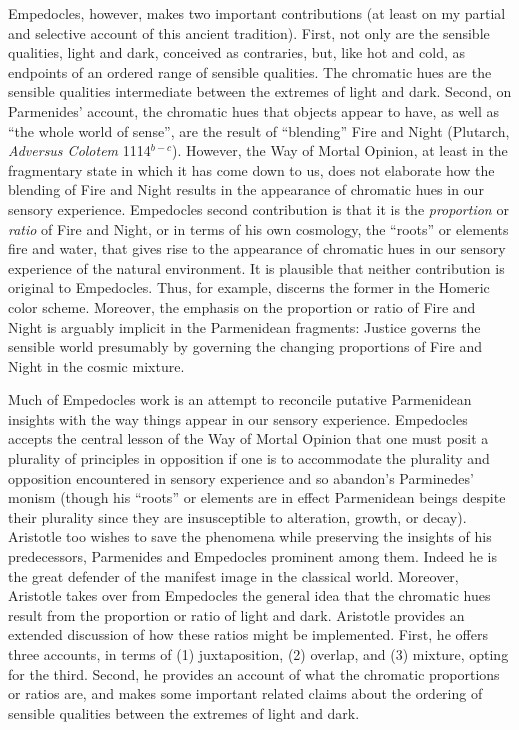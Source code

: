 Empedocles, however, makes two important contributions (at least on my partial and selective account of this ancient tradition). First, not only are the sensible qualities, light and dark, conceived as contraries, but, like hot and cold, as endpoints of an ordered range of sensible qualities. The chromatic hues are the sensible qualities intermediate between the extremes of light and dark. Second, on Parmenides' account, the chromatic hues that objects appear to have, as well as ``the whole world of sense'', are the result of ``blending'' Fire and Night (Plutarch, \emph{Adversus Colotem} 1114\( ^{b-c} \)). However, the Way of Mortal Opinion, at least in the fragmentary state in which it has come down to us, does not elaborate how the blending of Fire and Night results in the appearance of chromatic hues in our sensory experience. Empedocles second contribution is that it is the \emph{proportion} or \emph{ratio} of Fire and Night, or in terms of his own cosmology, the ``roots'' or elements fire and water, that gives rise to the appearance of chromatic hues in our sensory experience of the natural environment. It is plausible that neither contribution is original to Empedocles. Thus, for example, \citet{Gladstone:1858fk} discerns the former in the Homeric color scheme. Moreover, the emphasis on the proportion or ratio of Fire and Night is arguably implicit in the Parmenidean fragments: Justice governs the sensible world presumably by governing the changing proportions of Fire and Night in the cosmic mixture.

Much of Empedocles work is an attempt to reconcile putative Parmenidean insights with the way things appear in our sensory experience. Empedocles accepts the central lesson of the Way of Mortal Opinion that one must posit a plurality of principles in opposition if one is to accommodate the plurality and opposition encountered in sensory experience and so abandon's Parminedes' monism (though his ``roots'' or elements are in effect Parmenidean beings despite their plurality since they are insusceptible to alteration, growth, or decay). Aristotle too wishes to save the phenomena while preserving the insights of his predecessors, Parmenides and Empedocles prominent among them. Indeed he is the great defender of the manifest image in the classical world. Moreover, Aristotle takes over from Empedocles the general idea that the chromatic hues result from the proportion or ratio of light and dark. Aristotle provides an extended discussion of how these ratios might be implemented. First, he offers three accounts, in terms of (1) juxtaposition, (2) overlap, and (3) mixture, opting for the third. Second, he provides an account of what the chromatic proportions or ratios are, and makes some important related claims about the ordering of sensible qualities between the extremes of light and dark.

